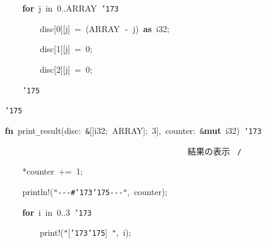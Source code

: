 \documentclass[a4paper,10pt]{article}
\def\mc{\relax}
\begin{document}
\noindent
\mbox{}{\tt\mc \ }{\tt\mc \ }{\tt\mc \ }{\tt\mc \ }\textbf{for}{\tt\mc \ }j{\tt\mc \ }in{\tt\mc \ }0..ARRAY{\tt\mc \ }{\tt\char'173}

\noindent
\mbox{}{\tt\mc \ }{\tt\mc \ }{\tt\mc \ }{\tt\mc \ }{\tt\mc \ }{\tt\mc \ }{\tt\mc \ }{\tt\mc \ }disc[0][j]{\tt\mc \ }={\tt\mc \ }(ARRAY{\tt\mc \ }{\tt -}{\tt\mc \ }j){\tt\mc \ }\textbf{as}{\tt\mc \ }i32;

\noindent
\mbox{}{\tt\mc \ }{\tt\mc \ }{\tt\mc \ }{\tt\mc \ }{\tt\mc \ }{\tt\mc \ }{\tt\mc \ }{\tt\mc \ }disc[1][j]{\tt\mc \ }={\tt\mc \ }0;

\noindent
\mbox{}{\tt\mc \ }{\tt\mc \ }{\tt\mc \ }{\tt\mc \ }{\tt\mc \ }{\tt\mc \ }{\tt\mc \ }{\tt\mc \ }disc[2][j]{\tt\mc \ }={\tt\mc \ }0;

\noindent
\mbox{}{\tt\mc \ }{\tt\mc \ }{\tt\mc \ }{\tt\mc \ }{\tt\char'175}

\noindent
\mbox{}{\tt\char'175}

\noindent
\mbox{}\hfill

\noindent
\mbox{}\textbf{fn}{\tt\mc \ }print{\tt\_}result(disc:{\tt\mc \ }{\tt\&}[[i32;{\tt\mc \ }ARRAY];{\tt\mc \ }3],{\tt\mc \ }counter:{\tt\mc \ }{\tt\&}\textbf{mut}{\tt\mc \ }i32){\tt\mc \ }{\tt\char'173}

\noindent
\mbox{}{\tt\mc \ }{\tt\mc \ }{\tt\mc \ }{\tt\mc \ }{\tt\mc \ }{\tt\mc \ }{\tt\mc \ }{\tt\mc \ }{\tt\mc \ }{\tt\mc \ }{\tt\mc \ }{\tt\mc \ }{\tt\mc \ }{\tt\mc \ }{\tt\mc \ }{\tt\mc \ }{\tt\mc \ }{\tt\mc \ }{\tt\mc \ }{\tt\mc \ }{\tt\mc \ }{\tt\mc \ }{\tt\mc \ }{\tt\mc \ }{\tt\mc \ }{\tt\mc \ }{\tt\mc \ }{\tt\mc \ }{\tt\mc \ }{\tt\mc \ }{\tt\mc \ }{\tt\mc \ }{\tt\mc \ }{\tt\mc \ }{\tt\mc \ }{\tt\mc \ }{\tt\mc \ }{\tt\mc \ }{\tt\mc \ }{\tt\mc \ }\rm\mc {\tt /}{\tt *}\  \ 結果の表示 \hfill \rm\mc \ {\tt *}{\tt /}
\tt\mc 

\noindent
\mbox{}{\tt\mc \ }{\tt\mc \ }{\tt\mc \ }{\tt\mc \ }*counter{\tt\mc \ }+={\tt\mc \ }1;

\noindent
\mbox{}{\tt\mc \ }{\tt\mc \ }{\tt\mc \ }{\tt\mc \ }println!({\tt "}{\tt -}{\tt -}{\tt -}{\tt\#}{\tt\char'173}{\tt\char'175}{\tt -}{\tt -}{\tt -}{\tt "},{\tt\mc \ }counter);

\noindent
\mbox{}{\tt\mc \ }{\tt\mc \ }{\tt\mc \ }{\tt\mc \ }\textbf{for}{\tt\mc \ }i{\tt\mc \ }in{\tt\mc \ }0..3{\tt\mc \ }{\tt\char'173}

\noindent
\mbox{}{\tt\mc \ }{\tt\mc \ }{\tt\mc \ }{\tt\mc \ }{\tt\mc \ }{\tt\mc \ }{\tt\mc \ }{\tt\mc \ }print!({\tt "}[{\tt\char'173}{\tt\char'175}]{\tt\mc \ }{\tt "},{\tt\mc \ }i);
\end{document}
